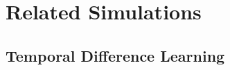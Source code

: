 \chapter{Related Simulations}
\label{chapter:related_simulations}

\section{Temporal Difference Learning}




